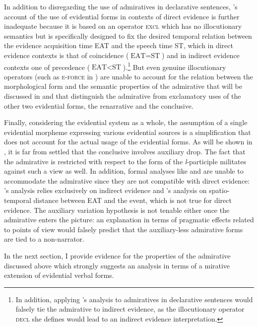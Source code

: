 \documentclass[output=paper,
colorlinks,
citecolor=brown,
newtxmath
]{langscibook}
\begin{document}
In addition to disregarding the use of admiratives in declarative sentences, \citeauthor{Smirnova2013}'s account of the use of evidential forms in contexts of direct evidence is further inadequate because it is based on an operator \textsc{excl} which has no illocutionary semantics but is specifically designed to fix the desired temporal relation between the evidence acquisition time EAT and the speech time ST, which in direct evidence contexts is that of coincidence ($\text{EAT}=\text{ST}$) and in indirect evidence contexts one of precedence ($\text{EAT}<\text{ST}$).\footnote{In addition, applying \citeauthor{Smirnova2013}'s analysis to admiratives in declarative sentences would falsely tie the admirative to indirect evidence, as the illocutionary operator \textsc{decl} she defines would lead to an indirect evidence interpretation.} But even genuine illocutionary operators (such as \textsc{e-force} in \citealt[429]{Rett2011}) are unable to account for the relation between the morphological form and the semantic properties of the admirative that will be discussed in  and that distinguish the admirative from exclamatory uses of the other two evidential forms, the renarrative and the conclusive.

Finally, considering the  evidential system as a whole, the assumption of a single evidential morpheme expressing various evidential sources is a simplification that does not account for the actual usage of the  evidential forms. As will be shown in , it is far from settled that the conclusive involves auxiliary drop. The fact that the admirative is restricted with respect to the form of the \textit{l}-participle militates against such a view as well. In addition, formal analyses like \citet{Izvorski1997} and \citet{Koev2017} are unable to accommodate the admirative since they are not compatible with direct evidence: \citeauthor{Izvorski1997}'s analysis relies exclusively on indirect evidence and \citeauthor{Koev2017}'s analysis on spatio-temporal distance between EAT and the event, which is not true for direct evidence. The auxiliary variation hypothesis is not tenable either once the admirative enters the picture: an explanation in terms of pragmatic effects related to points of view would falsely predict that the auxiliary-less admirative forms are tied to a non-narrator.

In the next section, I provide evidence for the properties of the  admirative discussed above which strongly suggests an analysis in terms of a mirative extension of evidential verbal forms.
\end{document}
